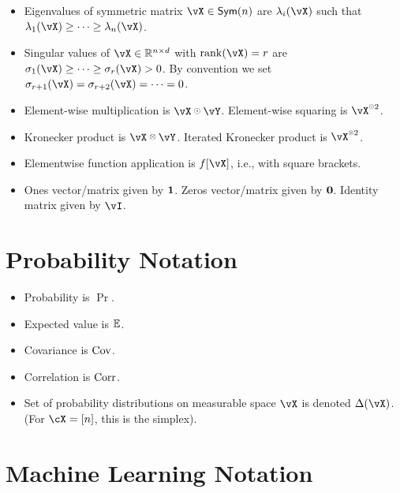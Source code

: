 \begin{itemize}
    \item Eigenvalues of symmetric matrix \(\vX \in \Sym(n)\) are \(\lambda_{i}(\vX)\) such that \(\lambda_{1}(\vX) \geq \cdots \geq \lambda_{n}(\vX)\).
    \item Singular values of \(\vX \in \R^{n \times d}\) with \(\rank(\vX) = r\) are \(\sigma_{1}(\vX) \geq \cdots \geq \sigma_{r}(\vX) > 0\). By convention we set \(\sigma_{r + 1}(\vX) = \sigma_{r + 2}(\vX) = \cdots = 0\).
    \item Element-wise multiplication is \(\vX \hada \vY\). Element-wise squaring is 
    $\vX^{\hada 2}$.
    \item Kronecker product is $\vX \kron \vY$. Iterated Kronecker product is $\vX^{\kron 2}$.
    \item Elementwise function application is \(f[\vX]\), i.e., with square brackets.
    \item Ones vector/matrix given by \(\bm{1}\). Zeros vector/matrix given by \(\bm{0}\). Identity matrix given by \(\vI\).
\end{itemize}

\section*{Probability Notation}

\begin{itemize}
    \item Probability is \(\Pr\).
    \item Expected value is \(\operatorname{\mathbb{E}}\). 
    \item Covariance is \(\operatorname{Cov}\). 
    \item Correlation is \(\operatorname{Corr}\).
    \item Set of probability distributions on measurable space \(\vX\) is denoted \(\Delta(\vX)\). (For \(\cX = [n]\), this is the simplex).
\end{itemize}

\section*{Machine Learning Notation}

